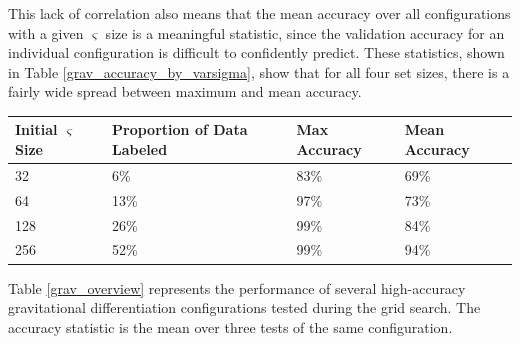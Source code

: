 \documentclass[10pt]{article}
\begin{document}
This lack of correlation also means that the mean accuracy over all configurations with a given $\varsigma$ size is a meaningful statistic, since the validation accuracy for an individual configuration is difficult to confidently predict. These statistics, shown in Table \ref{grav_accuracy_by_varsigma}, show that for all four set sizes, there is a fairly wide spread between maximum and mean accuracy.

\begin{minipage}{\textwidth}
    \begin{center}
         \label{grav_accuracy_by_varsigma}
        \begin{tabular}{|l|l|l|l|}
            \hline
            Initial $\varsigma$ Size & Proportion of Data Labeled & Max Accuracy & Mean Accuracy \\
            \hline
            32 & 6\% & 83\% & 69\% \\
            \hline
            64 & 13\% & 97\% & 73\% \\
            \hline
            128 & 26\% & 99\% & 84\% \\
            \hline
            256 & 52\% & 99\% & 94\% \\
            \hline
        \end{tabular}
    \end{center}
\end{minipage}

Table \ref{grav_overview} represents the performance of several high-accuracy gravitational differentiation configurations tested during the grid search. The accuracy statistic is the mean over three tests of the same configuration.
\end{document}
